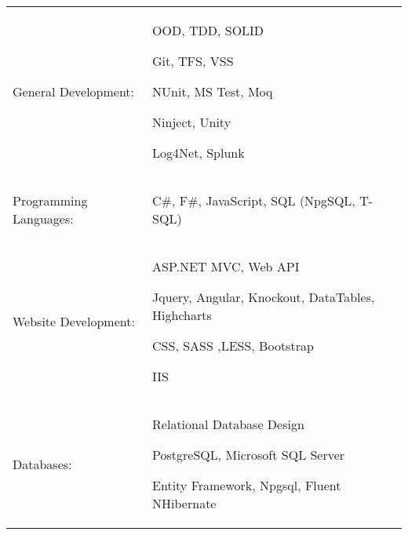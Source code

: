 \documentclass[a4paper,10pt]{article} %
\begin{document}
\begin{tabular}{ p{4cm} p{9cm}}
General Development:
&\MPtrue	    \begin{compactitem}
		\item OOD, TDD, SOLID
		\item Git, TFS, VSS
		\item NUnit, MS Test, Moq %
		\item Ninject, Unity
		\item Log4Net, Splunk
	\end{compactitem} \\
%
Programming Languages:
&\MPtrue	    
	\begin{compactitem}
		\item C\#, F\#, JavaScript, SQL (NpgSQL, T-SQL)
	\end{compactitem} \\
%
Website Development:
&\MPtrue	    
	\begin{compactitem}
		\item ASP.NET MVC, Web API
		\item Jquery, Angular, Knockout, DataTables, Highcharts
		\item CSS, SASS ,LESS, Bootstrap
		\item IIS
	\end{compactitem} \\
%
Databases: 
&\MPtrue	    \begin{compactitem}
		\item Relational Database Design
		\item PostgreSQL, Microsoft SQL Server
		\item Entity Framework, Npgsql, Fluent NHibernate
	\end{compactitem} \\
\end{tabular}


  		 
\end{document}
